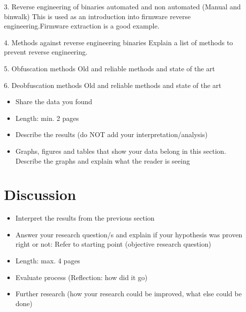 \documentclass[]{report}
\begin{document}
3. Reverse engineering of binaries automated and non automated (Manual and binwalk)
	This is used as an introduction into firmware reverse engineering.Firmware extraction is a good example.

4. Methods against reverse engineering binaries
	Explain a list of methods to prevent reverse engineering.
	
5. Obfuscation methods 
	Old and reliable methods and state of the art
	
6. Deobfuscation methods
	Old and reliable methods and state of the art


\begin{itemize}
	\item Share the data you found
	\item Length: min. 2 pages
	\item Describe the results (do NOT add your interpretation/analysis)
	\item Graphs, figures and tables that show your data belong in this section. Describe the graphs and explain what the reader is seeing

\end{itemize}

	
\section{Discussion}
\begin{itemize}
	\item Interpret the results from the previous section
	\item Answer your research question/s and explain if your hypothesis was proven right or not: Refer to starting point (objective research question)

	\item Length: max. 4 pages
	\item Evaluate process (Reflection: how did it go)
	\item Further research (how your research could be improved, what else could be done)
\end{itemize}
\end{document}
